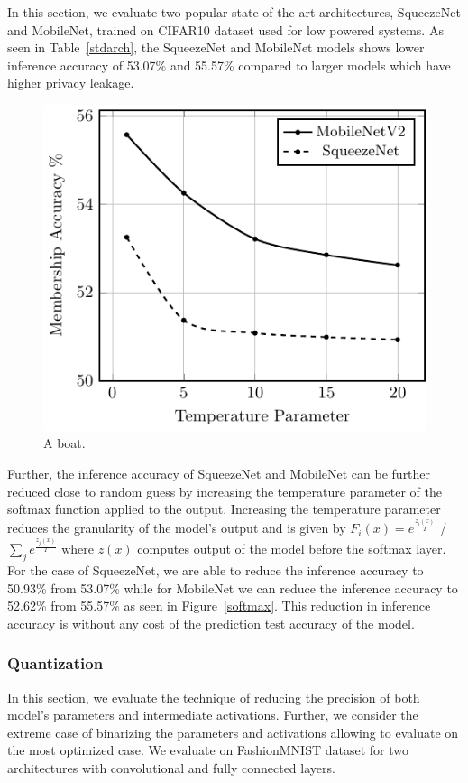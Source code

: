 In this section, we evaluate two popular state of the art architectures, SqueezeNet and MobileNet, trained on CIFAR10 dataset used for low powered systems.
As seen in Table~\ref{stdarch}, the SqueezeNet and MobileNet models shows lower inference accuracy of 53.07\% and 55.57\% compared to larger models which have higher privacy leakage.


\begin{figure}
  \includegraphics[width=0.6\columnwidth]{figures/efficientArch.pdf}
  \caption{A boat.}
  \label{fig:wtsharing}
\end{figure}

Further, the inference accuracy of SqueezeNet and MobileNet can be further reduced close to random guess by increasing the temperature parameter of the softmax function applied to the output.
Increasing the temperature parameter reduces the granularity of the model's output and is given by
$F_i(x) = e^{\frac{z_i(x)}{T}}$ / $ \sum_{j}e^{\frac{z_j(x)}{T}}$
where $z(x)$ computes output of the model before the softmax layer.
For the case of SqueezeNet, we are able to reduce the inference accuracy to 50.93\% from 53.07\% while for MobileNet we can reduce the inference accuracy to 52.62\% from 55.57\% as seen in Figure~\ref{softmax}.
This reduction in inference accuracy is without any cost of the prediction test accuracy of the model.




\subsubsection{Quantization}

In this section, we evaluate the technique of reducing the precision of both model's parameters and intermediate activations.
Further, we consider the extreme case of binarizing the parameters and activations allowing to evaluate on the most optimized case.
We evaluate on FashionMNIST dataset for two architectures with convolutional and fully connected layers.

